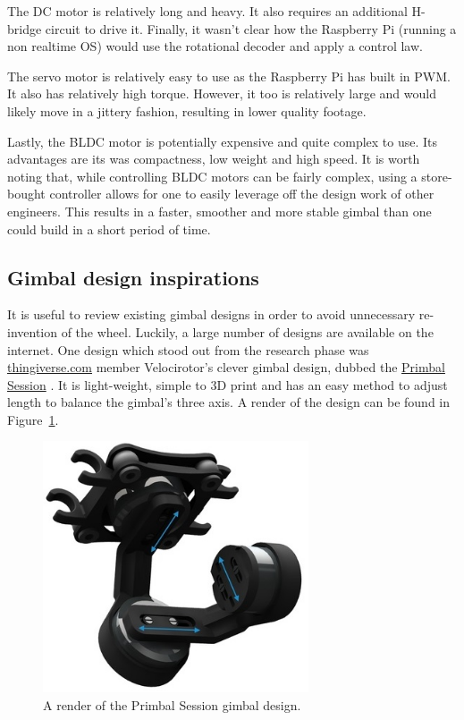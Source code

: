 The DC motor is relatively long and heavy. It also requires an additional H-bridge circuit to drive it. Finally, it wasn't clear how the Raspberry Pi (running a non realtime OS) would use the rotational decoder and apply a control law.

The servo motor is relatively easy to use as the Raspberry Pi has built in PWM. It also has relatively high torque. However, it too is relatively large and would likely move in a jittery fashion, resulting in lower quality footage.

Lastly, the BLDC motor is potentially expensive and quite complex to use. Its advantages are its was compactness, low weight and high speed. It is worth noting that, while controlling BLDC motors can be fairly complex, using a store-bought controller allows for one to easily leverage off the design work of other engineers. This results in a faster, smoother and more stable gimbal than one could build in a short period of time.

\subsection{\label{ssec:gimbal_design_inspirations}Gimbal design inspirations}
It is useful to review existing gimbal designs in order to avoid unnecessary re-invention of the wheel. Luckily, a large number of designs are available on the internet. One design which stood out from the research phase was \href{https://www.thingiverse.com}{thingiverse.com} member Velocirotor's clever gimbal design, dubbed the \href{https://www.thingiverse.com/thing:2804872}{Primbal Session} \cite{website:primbal_session}. It is light-weight, simple to 3D print and has an easy method to adjust length to balance the gimbal's three axis. A render of the design can be found in Figure~\ref{fig:primbal_pic}.

\begin{figure}[h!]
  \centering
  \includegraphics[width=0.7\textwidth]{literature_review/primbal_pic.jpg}
  \caption{\label{fig:primbal_pic} A render of the Primbal Session gimbal design.}
\end{figure}

